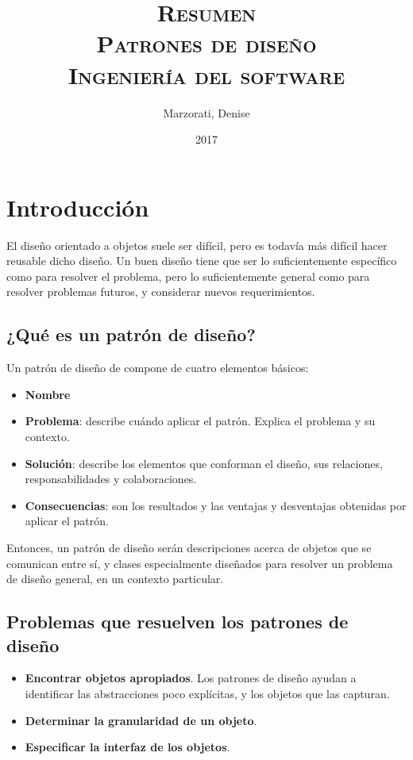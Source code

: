 \documentclass[a4paper, 10pt]{article}
\author{
    Marzorati, Denise \\
}
\date{
    2017
}
\title{
    \Huge \textsc{{\bfseries R}esumen} \\
    \Huge \textsc{Patrones de diseño} \\
    \large \textsc{Ingeniería del software} \\
}
\begin{document}
\maketitle

\section*{Introducción}
  El diseño orientado a objetos suele ser difícil, pero es todavía más difícil hacer reusable dicho
diseño. Un buen diseño tiene que ser lo suficientemente específico como para resolver el problema,
pero lo suficientemente general como para resolver problemas futuros, y considerar nuevos
requerimientos.

\subsection*{¿Qué es un patrón de diseño?}
  Un patrón de diseño de compone de cuatro elementos básicos:

  \begin{itemize}
    \item {\bfseries Nombre}
    \item {\bfseries Problema}: describe cuándo aplicar el patrón. Explica el problema y su
contexto.
    \item {\bfseries Solución}: describe los elementos que conforman el diseño, sus relaciones,
responsabilidades y colaboraciones.
    \item{\bfseries Consecuencias}: son los resultados y las ventajas y desventajas obtenidas por
aplicar el patrón.
  \end{itemize}

  Entonces, un patrón de diseño serán descripciones acerca de objetos que se comunican entre sí, y
clases especialmente diseñados para resolver un problema de diseño general, en un contexto
particular.

\subsection*{Problemas que resuelven los patrones de diseño}

  \begin{itemize}
    \item {\bfseries Encontrar objetos apropiados}. Los patrones de diseño ayudan a identificar las
abstracciones poco explícitas, y los objetos que las capturan.
    \item{\bfseries Determinar la granularidad de un objeto}.
    \item{\bfseries Especificar la interfaz de los objetos}.
  \end{itemize}
\end{document}
